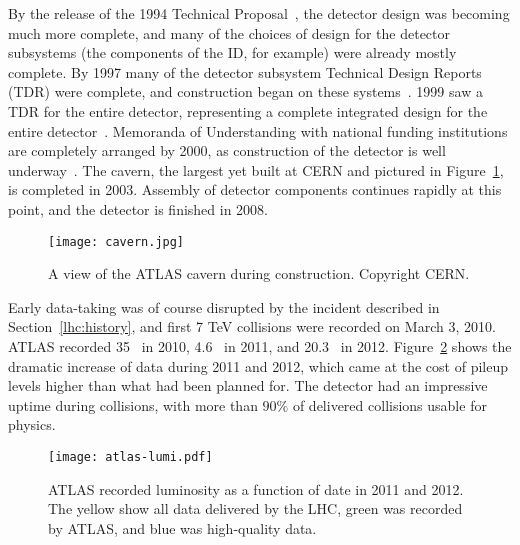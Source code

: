 
By the release of the 1994 Technical Proposal~\cite{ATLASTP}, the detector design was becoming much more complete, and many of the choices of design for the detector subsystems (the components of the ID, for example) were already mostly complete. By 1997 many of the detector subsystem Technical Design Reports (TDR) were complete, and construction began on these systems~\cite{ATLASHistory}. 1999 saw a TDR for the entire detector, representing a complete integrated design for the entire detector~\cite{tdr1,tdr2}. Memoranda of Understanding with national funding institutions are completely arranged by 2000, as construction of the detector is well underway~\cite{ATLASHistory}. The cavern, the largest yet built at CERN and pictured in Figure~\ref{fig:detector:cavern}, is completed in 2003. Assembly of detector components continues rapidly at this point, and the detector is finished in 2008.


\begin{figure}
\centering
\texttt{[image: cavern.jpg]}
\label{fig:detector:cavern}
\caption{A view of the ATLAS cavern during construction. Copyright CERN.}
\end{figure}


Early data-taking was of course disrupted by the incident described in Section~\ref{lhc:history}, and first 7 TeV collisions were recorded on March 3, 2010. ATLAS recorded 35 \ipb~in 2010, 4.6 \ifb~in 2011, and 20.3 \ifb~in 2012. Figure~\ref{fig:detector:lumi} shows the dramatic increase of data during 2011 and 2012, which came at the cost of pileup levels higher than what had been planned for. The detector had an impressive uptime during collisions, with more than $90\%$ of delivered collisions usable for physics.



\begin{figure}
\centering
\texttt{[image: atlas-lumi.pdf]}
\label{fig:detector:lumi}
\caption{ATLAS recorded luminosity as a function of date in 2011 and 2012. The yellow show all data delivered by the LHC, green was recorded by ATLAS, and blue was high-quality data.}
\end{figure}





